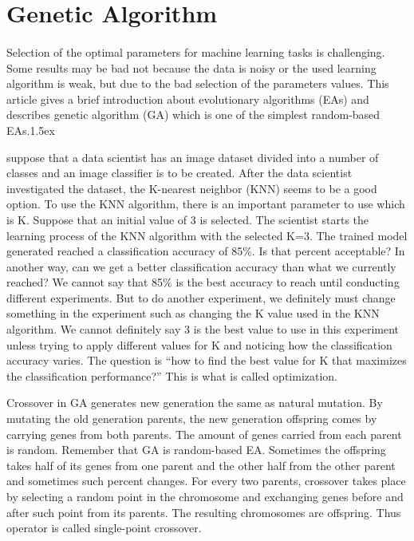 \documentclass[a4paper,12pt]{report}
\begin{document}
{	
	
	
	
	
	
	\section{Genetic Algorithm}
	\paragraph{}
	{
		
		\linespread{1.5}
		Selection of the optimal parameters for machine learning tasks is challenging. Some results may be bad not because the data is noisy or the used learning algorithm is weak, but due to the bad selection of the parameters values. This article gives a brief introduction about evolutionary algorithms (EAs) and describes genetic algorithm (GA) which is one of the simplest random-based EAs.\parskip 1.5ex
		
		suppose that a data scientist has an image dataset divided into a number of classes and an image classifier is to be created. After the data scientist investigated the dataset, the K-nearest neighbor (KNN) seems to be a good option. To use the KNN algorithm, there is an important parameter to use which is K. Suppose that an initial value of 3 is selected. The scientist starts the learning process of the KNN algorithm with the selected K=3. The trained model generated reached a classification accuracy of 85\%. Is that percent acceptable? In another way, can we get a better classification accuracy than what we currently reached? We cannot say that 85\% is the best accuracy to reach until conducting different experiments. But to do another experiment, we definitely must change something in the experiment such as changing the K value used in the KNN algorithm. We cannot definitely say 3 is the best value to use in this experiment unless trying to apply different values for K and noticing how the classification accuracy varies. The question is “how to find the best value for K that maximizes the classification performance?” This is what is called optimization.
		
		
		
		Crossover in GA generates new generation the same as natural mutation. By mutating the old generation parents, the new generation offspring comes by carrying genes from both parents. The amount of genes carried from each parent is random. Remember that GA is random-based EA. Sometimes the offspring takes half of its genes from one parent and the other half from the other parent and sometimes such percent changes. For every two parents, crossover takes place by selecting a random point in the chromosome and exchanging genes before and after such point from its parents. The resulting chromosomes are offspring. Thus operator is called single-point crossover.
		
}}
\end{document}
